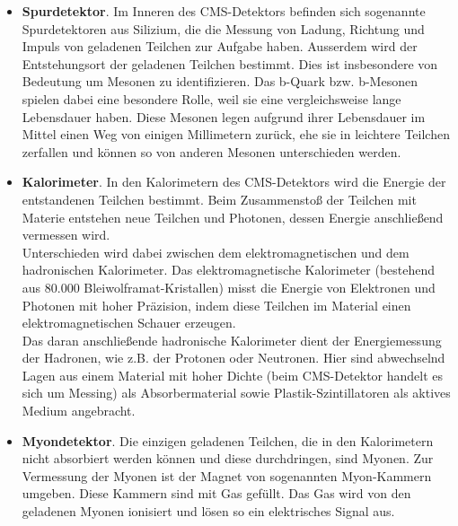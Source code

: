 \begin{itemize}
\item \textbf{Spurdetektor}. Im Inneren des CMS-Detektors befinden sich sogenannte Spurdetektoren aus Silizium, die die Messung von Ladung, Richtung und Impuls von geladenen Teilchen zur Aufgabe haben. Ausserdem wird der Entstehungsort der geladenen Teilchen bestimmt. Dies ist insbesondere von Bedeutung um Mesonen zu identifizieren. Das b-Quark bzw. b-Mesonen spielen dabei eine besondere Rolle, weil sie eine vergleichsweise lange Lebensdauer haben. Diese Mesonen legen aufgrund ihrer Lebensdauer im Mittel einen Weg von einigen Millimetern zur\"uck, ehe sie in leichtere Teilchen zerfallen und k\"onnen so von anderen Mesonen unterschieden werden. 
\item \textbf{Kalorimeter}. In den Kalorimetern des CMS-Detektors wird die Energie der entstandenen Teilchen bestimmt. Beim Zusammensto{\ss} der Teilchen mit Materie entstehen neue Teilchen und Photonen, dessen Energie anschlie{\ss}end vermessen wird.\\
Unterschieden wird dabei zwischen dem elektromagnetischen und dem hadronischen Kalorimeter. Das elektromagnetische Kalorimeter (bestehend aus 80.000 Blei\-wol\-fra\-mat-Kristallen) misst die Energie von Elektronen und Photonen mit hoher Pr\"azision, indem diese Teilchen im Material einen elektromagnetischen Schauer erzeugen.\\
Das daran anschlie{\ss}ende hadronische Kalorimeter dient der Energiemessung der Hadronen, wie z.B. der Protonen oder Neutronen. Hier sind abwechselnd Lagen aus einem Material mit hoher Dichte (beim CMS-Detektor handelt es sich um Messing) als Absorbermaterial sowie Plastik-Szintillatoren als aktives Medium angebracht. 
\item \textbf{Myondetektor}. Die einzigen geladenen Teilchen, die in den Kalorimetern nicht absorbiert werden k\"onnen und diese durchdringen, sind Myonen. Zur Vermessung der Myonen ist der Magnet von sogenannten Myon-Kammern umgeben. Diese Kammern sind mit Gas gef\"ullt. Das Gas wird von den geladenen Myonen ionisiert und l\"osen so ein elektrisches Signal aus.
\end{itemize}

